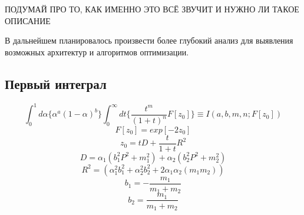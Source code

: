 \documentclass{article}
\begin{document}
\large{ПОДУМАЙ ПРО ТО, КАК ИМЕННО ЭТО ВСЁ ЗВУЧИТ И НУЖНО ЛИ ТАКОЕ ОПИСАНИЕ}

В дальнейшем планировалось произвести более глубокий анализ для выявления возможных архитектур и алгоритмов оптимизации.

\subsection{Первый интеграл}

\begin{equation}
    \int_{0}^{1}d\alpha\{\alpha^{a}(1 - \alpha)^b\}\int_{0}^{\infty}dt\{\frac{t^m}{(1+t)^n}F[z_{0}]\} \equiv I(a, b, m, n; F[z_{0}])
\end{equation}
\begin{equation}  
    F[z_0] = exp[-2z_0]
\end{equation}
\begin{equation} 
    z_0 = tD + \frac{t}{1 + t}R^2
\end{equation}
\begin{equation}     
    D = \alpha_1(b_1^{2}P^2 + m_1^2) + \alpha_2(b_2^{2}P^2 + m_2^2)
\end{equation}
\begin{equation} 
    R^2 = (\alpha_1^{2}b_1^2 + \alpha_2^{2}b_2^2 + 2\alpha_{1}\alpha_{2}(m_{1}m_2))
\end{equation}
\begin{equation} 
    b_1 = -\frac{m_1}{m_1 + m_2}
\end{equation}
\begin{equation} 
    b_2 = \frac{m_1}{m_1 + m_2}
\end{equation}

\printbibliography[
heading=bibintoc,
title={Список использованной литературы}
]
\end{document}
